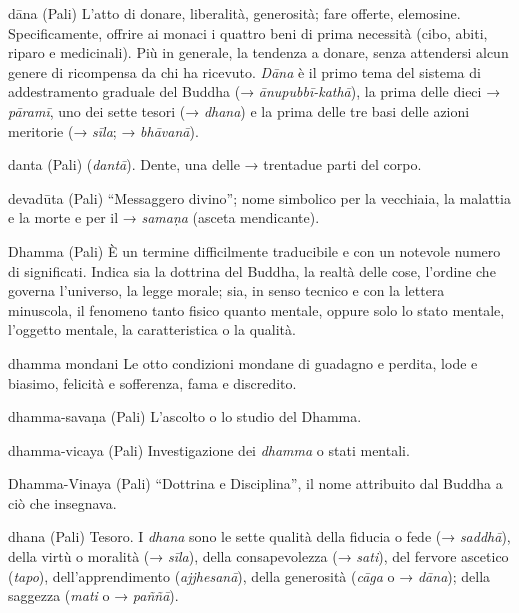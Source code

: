 \begin{glossarydescription}
\item[dāna] (Pali) L'atto di donare, liberalità, generosità; fare offerte,
elemosine. Specificamente, offrire ai monaci i quattro beni di prima
necessità (cibo, abiti, riparo e medicinali). Più in generale, la
tendenza a donare, senza attendersi alcun genere di ricompensa da chi ha
ricevuto. \emph{Dāna} è il primo tema del sistema di addestramento
graduale del Buddha (→ \emph{ānupubbī-kathā}), la prima delle dieci →
\emph{pāramī}, uno dei sette tesori (→ \emph{dhana}) e la prima delle
tre basi delle azioni meritorie (→ \emph{sīla}; → \emph{bhāvanā}).

\item[danta] (Pali) (\emph{dantā}). Dente, una delle → trentadue parti del
corpo.

\item[devadūta] (Pali) ``Messaggero divino''; nome simbolico per la vecchiaia,
la malattia e la morte e per il → \emph{samaṇa} (asceta mendicante).

\item[Dhamma] (Pali) È un termine difficilmente traducibile e con un
notevole numero di significati. Indica sia la dottrina del Buddha, la
realtà delle cose, l'ordine che governa l'universo, la legge morale;
sia, in senso tecnico e con la lettera minuscola, il fenomeno tanto
fisico quanto mentale, oppure solo lo stato mentale, l'oggetto mentale,
la caratteristica o la qualità.

\item[dhamma mondani] Le otto condizioni mondane di guadagno e perdita,
lode e biasimo, felicità e sofferenza, fama e discredito.

\item[dhamma-savaṇa] (Pali) L'ascolto o lo studio del Dhamma.

\item[dhamma-vicaya] (Pali) Investigazione dei \emph{dhamma} o stati mentali.

\item[Dhamma-Vinaya] (Pali) ``Dottrina e Disciplina'', il nome attribuito dal Buddha
a ciò che insegnava.

\item[dhana] (Pali) Tesoro. I \emph{dhana} sono le sette qualità della fiducia
o fede (→ \emph{saddhā}), della virtù o moralità (→ \emph{sīla}), della
consapevolezza (→ \emph{sati}), del fervore ascetico (\emph{tapo}),
dell'apprendimento (\emph{ajjhesanā}), della generosità (\emph{cāga} o →
\emph{dāna}); della saggezza (\emph{mati} o → \emph{paññā}).


\end{glossarydescription}
